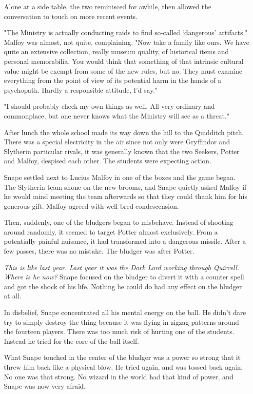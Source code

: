 Alone at a side table, the two reminisced for awhile, then allowed the conversation to touch on more recent events.

"The Ministry is actually conducting raids to find so-called `dangerous' artifacts." Malfoy was almost, not quite, complaining. "Now take a family like ours. We have quite an extensive collection, really museum quality, of historical items and personal memorabilia. You would think that something of that intrinsic cultural value might be exempt from some of the new rules, but no. They must examine everything from the point of view of its potential harm in the hands of a psychopath. Hardly a responsible attitude, I'd say."

"I should probably check my own things as well. All very ordinary and commonplace, but one never knows what the Ministry will see as a threat."

After lunch the whole school made its way down the hill to the Quidditch pitch. There was a special electricity in the air since not only were Gryffindor and Slytherin particular rivals, it was generally known that the two Seekers, Potter and Malfoy, despised each other. The students were expecting action.

Snape settled next to Lucius Malfoy in one of the boxes and the game began. The Slytherin team shone on the new brooms, and Snape quietly asked Malfoy if he would mind meeting the team afterwards so that they could thank him for his generous gift. Malfoy agreed with well-bred condescension.

Then, suddenly, one of the bludgers began to misbehave. Instead of shooting around randomly, it seemed to target Potter almost exclusively. From a potentially painful nuisance, it had transformed into a dangerous missile. After a few passes, there was no mistake. The bludger was after Potter.

\emph{This is like last year. Last year it was the Dark Lord working through Quirrell. Where is he now?} Snape focused on the bludger to divert it with a counter spell and got the shock of his life. Nothing he could do had any effect on the bludger at all.

In disbelief, Snape concentrated all his mental energy on the ball. He didn't dare try to simply destroy the thing because it was flying in zigzag patterns around the fourteen players. There was too much risk of hurting one of the students. Instead he tried for the core of the ball itself.

What Snape touched in the center of the bludger was a power so strong that it threw him back like a physical blow. He tried again, and was tossed back again. No one was that strong. No wizard in the world had that kind of power, and Snape was now very afraid.


